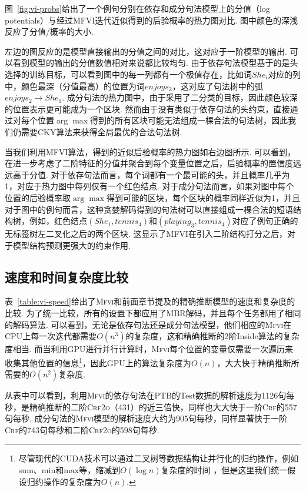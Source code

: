 图~\ref{fig:vi-probs}给出了一个例句分别在依存和成分句法模型上的分值（log potentials）与经过MFVI迭代近似得到的后验概率的热力图对比.
图中颜色的深浅反应了分值/概率的大小.

左边的图反应的是模型直接输出的分值之间的对比，这对应于一阶模型的输出.
可以看到模型的输出的分值数值相对来说都比较均匀.
由于依存句法模型基于的是头选择的训练目标，可以看到图中的每一列都有一个极值存在，比如词$She_i$对应的列中，颜色最深（分值最高）的位置为词$enjoys_2$，这对应了句法树中的弧$enjoys_2\rightarrow She_1$.
成分句法的热力图中，由于采用了二分类的目标，因此颜色较深的位置表示更可能成为一个区块.
然而由于没有类似于依存句法的头约束，直接通过对每个位置$\arg\max$得到的所有区块可能无法组成一棵合法的句法树，因此我们仍需要CKY算法来获得全局最优的合法句法树.

当我们利用MFVI算法，得到的近似后验概率的热力图如右边图所示.
可以看到，在进一步考虑了二阶特征的分值并聚合到每个变量位置之后，后验概率的置信度远远高于分值.
对于依存句法而言，每个词都有一个最可能的头，并且概率几乎为1，对应于热力图中每列仅有一个红色结点.
对于成分句法而言，如果对图中每个位置的后验概率取$\arg\max$得到可能的区块，每个区块的概率同样近似为1，并且对于图中的例句而言，这种贪婪解码得到的句法树可以直接组成一棵合法的短语结构树，例如，红色结点$(She_1,tennis_4)$和$(playing_3,tennis_4)$对应了例句正确的无标签树左二叉化之后的两个区块.
这显示了MFVI在引入二阶结构打分之后，对于模型结构预测更强大的约束作用.


\subsection{速度和时间复杂度比较}
\label{sub@sec:vi-speed}

表~\ref{table:vi-speed}给出了\textsc{Mfvi}和前面章节提及的精确推断模型的速度和复杂度的比较.
为了统一比较，所有的设置下都应用了MBR解码，并且每个任务都用了相同的解码算法.
可以看到，无论是依存句法还是成分句法模型，他们相应的\textsc{Mfvi}在CPU上每一次迭代都需要$O(n^3)$的复杂度，这和精确推断的2阶Inside算法的复杂度相当.
而当利用GPU进行并行计算时，\textsc{Mfvi}每个位置的变量仅需要一次遍历来收集其他位置的信息\footnote{尽管现代的CUDA技术可以通过二叉树等数据结构让并行化的归约操作，例如$\mathrm{sum}$、$\mathrm{min}$和$\mathrm{max}$等，缩减到$O(\log n)$复杂度的时间 \citep{wang-etal-2020-ain}，但是这里我们统一假设归约操作的复杂度为$O(n)$.}，因此GPU上的算法复杂度为$O(n)$，大大快于精确推断所需要的$O(n^2)$复杂度.

从表中可以看到，利用\textsc{Mfvi}的依存句法在PTB的Test数据的解析速度为1126句每秒，是精确推断的二阶\textsc{Crf2o}（431）的近三倍快，同样也大大快于一阶\textsc{Crf}的557句每秒.
成分句法的\textsc{Mfvi}模型的解析速度大约为905句每秒，同样显著快于一阶\textsc{Crf}的743句每秒和二阶\textsc{Crf2o}的598句每秒.

